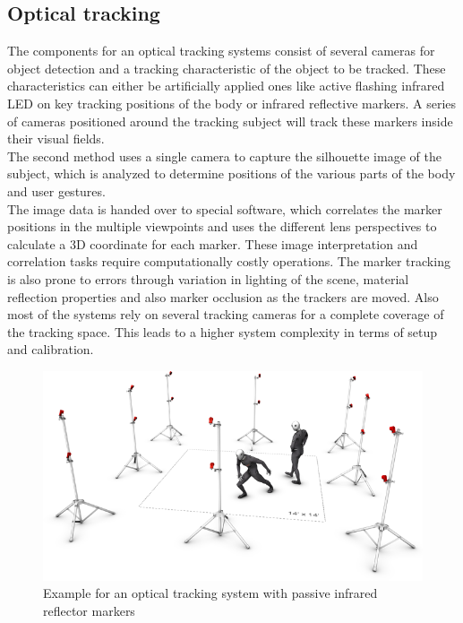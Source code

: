 \subsection{Optical tracking}
The components for an optical tracking systems consist of several cameras for object detection and a tracking characteristic of the object to be tracked. These characteristics can either be artificially applied ones like active flashing infrared LED on key tracking positions of the body or infrared reflective markers. A series of cameras positioned around the tracking subject will track these markers inside their visual fields. \\The second method uses a single camera to capture the silhouette image of the subject, which is analyzed to determine positions of the various parts of the body and user gestures.\\
The image data is handed over to special software, which correlates the marker positions in the multiple viewpoints and uses the different lens perspectives to calculate a 3D coordinate for each marker. These image interpretation and correlation tasks require computationally costly operations. The marker tracking is also prone to errors through variation in lighting of the scene, material reflection properties and also marker occlusion as the trackers are moved. Also most of the systems rely on several tracking cameras for a complete coverage of the tracking space. This leads to a higher system complexity in terms of setup and calibration.
\begin{figure}[H]
\label{optic reflector tracking}
\includegraphics[scale=0.6]{images/flex13MocapVolume.png} 
\caption{Example for an optical tracking system with passive infrared reflector markers \cite{optitrack.2017}}
\end{figure}
